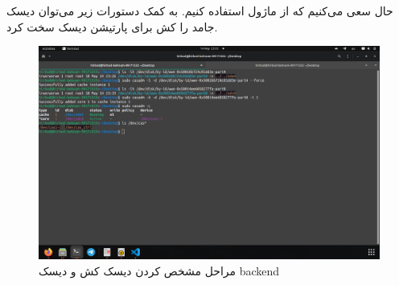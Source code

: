 حال سعی می‌کنیم که از ماژول
استفاده کنیم. به کمک دستورات زیر می‌توان دیسک جامد را کش برای پارتیشن دیسک سخت کرد.
\begin{figure}[H]
    \centering
    \includegraphics[scale=0.25]{pic/3-cas-activate.png}
    \caption{مراحل مشخص کردن دیسک کش و دیسک backend}
\end{figure}

